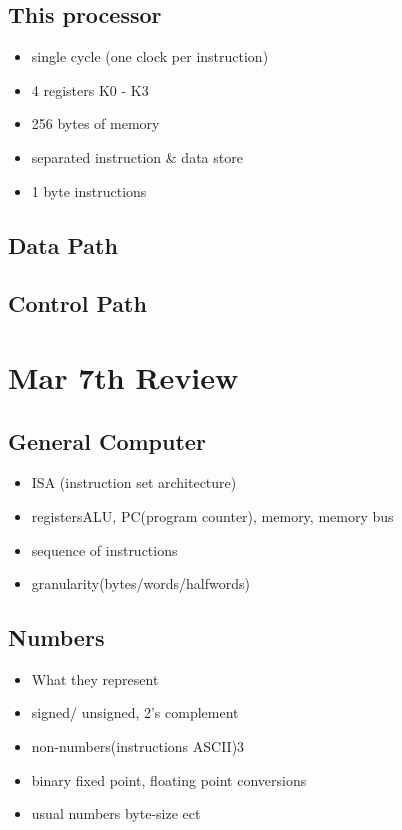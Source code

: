\documentclass[11pt]{article}
\begin{document}
\subsection{This processor}
\label{sec:orgheadline81}
\begin{itemize}
\item single cycle (one clock per instruction)
\item 4 registers K0 - K3
\item 256 bytes of memory
\item separated instruction \& data store
\item 1 byte instructions
\end{itemize}
\subsection{Data Path}
\label{sec:orgheadline82}
\subsection{Control Path}
\label{sec:orgheadline83}
\section{Mar 7th Review}
\label{sec:orgheadline89}
\subsection{General Computer}
\label{sec:orgheadline85}
\begin{itemize}
\item ISA (instruction set architecture)
\item registersALU, PC(program counter), memory, memory bus
\item sequence of instructions
\item granularity(bytes/words/halfwords)
\end{itemize}
\subsection{Numbers}
\label{sec:orgheadline86}
\begin{itemize}
\item What they represent
\item signed/ unsigned, 2's complement
\item non-numbers(instructions ASCII)3
\item binary fixed point, floating point conversions
\item usual numbers byte-size ect
\end{itemize}
\end{document}
